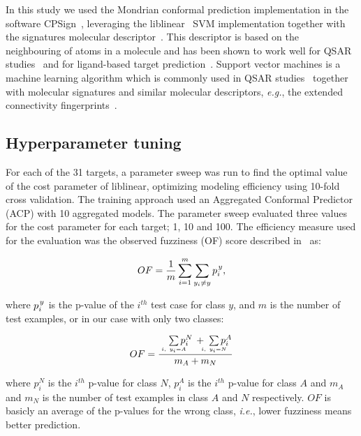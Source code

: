 \documentclass[10pt,article]{memoir}
\begin{document}
In this study we used the Mondrian conformal prediction implementation in the
software CPSign~\cite{CPSignDocs}, leveraging the
liblinear~\cite{fan2008liblinear} SVM implementation together with the
signatures molecular descriptor~\cite{faulon2003signature}.  This descriptor is
based on the neighbouring of atoms in a molecule and has been shown to work
well for QSAR studies~\cite{lapins2018confidence,Alvarsson:2016pw} and for
ligand-based target prediction~\cite{alvarsson2014ligand}. Support vector
machines is a machine learning algorithm which is commonly used in QSAR
studies~\cite{norinder2003support,zhou2011qsar} together with molecular
signatures and similar molecular descriptors, \textit{e.g.}, the extended
connectivity fingerprints~\cite{rogers2010extended}.


\subsection{Hyperparameter tuning}
For each of the 31 targets, a parameter sweep was run to find the optimal value
of the cost parameter of liblinear, optimizing modeling efficiency using
10-fold cross validation. The training approach used an Aggregated Conformal
Predictor (ACP) with 10 aggregated models.  The parameter sweep evaluated three
values for the cost parameter for each target; 1, 10 and 100. The efficiency
measure used for the evaluation was the observed fuzziness (OF) score described
in~\cite{Vovk2016} as:

\begin{equation}
OF =\frac{ 1}{m} \sum\limits_{i=1}^{m} \sum\limits_{y_i \neq y }  p_i^{\kern1pt y},		
\end{equation}

where $p_i^{\kern1pt y}$ is the p-value of the $i^{th}$ test case for class $y$, and $m$ is the number of test examples, or in our case with only two classes:

\begin{equation}
OF =  \frac
        {\quad\sum\limits_{\mathclap{\substack{\scriptscriptstyle i,\ y_i=A}}}p_i^N \, + \;\sum\limits_{\mathclap{\substack{\scriptscriptstyle i,\ y_i=N}}}p_i^A}
        {m_A + m_N} 
\end{equation}

where $p_i^N$ is the $i^{th}$ p-value for class $N$, $p_i^A$ is the $i^{th}$
p-value for class $A$ and $m_A$ and $m_N$ is the number of test examples in
class $A$ and $N$ respectively. $OF$ is basicly an average of the p-values for
the wrong class, \textit{i.e.}, lower fuzziness means better prediction.
\end{document}
